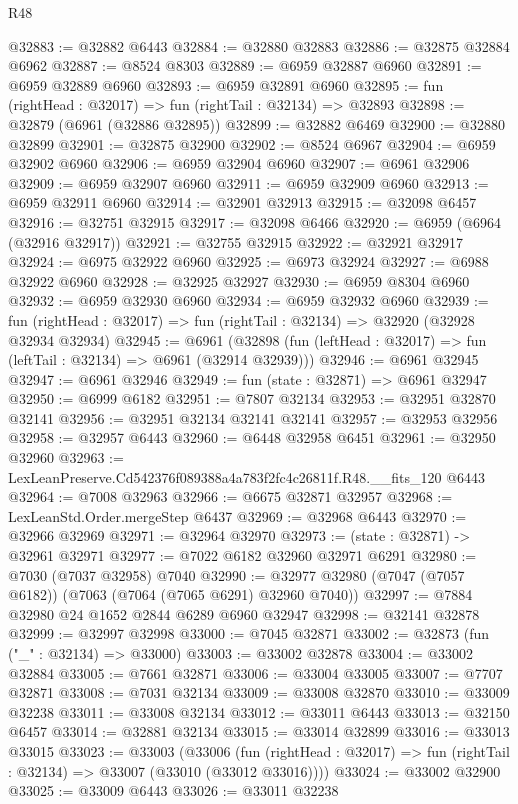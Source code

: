 \begin{lexlean}{R48}
\begin{coremodule}
@32883 := @32882 @6443
@32884 := @32880 @32883
@32886 := @32875 @32884 @6962
@32887 := @8524 @8303
@32889 := @6959 @32887 @6960
@32891 := @6959 @32889 @6960
@32893 := @6959 @32891 @6960
@32895 := fun (rightHead : @32017) => fun (rightTail : @32134) => @32893
@32898 := @32879 (@6961 (@32886 @32895))
@32899 := @32882 @6469
@32900 := @32880 @32899
@32901 := @32875 @32900
@32902 := @8524 @6967
@32904 := @6959 @32902 @6960
@32906 := @6959 @32904 @6960
@32907 := @6961 @32906
@32909 := @6959 @32907 @6960
@32911 := @6959 @32909 @6960
@32913 := @6959 @32911 @6960
@32914 := @32901 @32913
@32915 := @32098 @6457
@32916 := @32751 @32915
@32917 := @32098 @6466
@32920 := @6959 (@6964 (@32916 @32917))
@32921 := @32755 @32915
@32922 := @32921 @32917
@32924 := @6975 @32922 @6960
@32925 := @6973 @32924
@32927 := @6988 @32922 @6960
@32928 := @32925 @32927
@32930 := @6959 @8304 @6960
@32932 := @6959 @32930 @6960
@32934 := @6959 @32932 @6960
@32939 := fun (rightHead : @32017) => fun (rightTail : @32134) => @32920 (@32928 @32934 @32934)
@32945 := @6961
    (@32898 (fun (leftHead : @32017) => fun (leftTail : @32134) => @6961 (@32914 @32939)))
@32946 := @6961 @32945
@32947 := @6961 @32946
@32949 := fun (state : @32871) => @6961 @32947
@32950 := @6999 @6182
@32951 := @7807 @32134
@32953 := @32951 @32870 @32141
@32956 := @32951 @32134 @32141 @32141
@32957 := @32953 @32956
@32958 := @32957 @6443
@32960 := @6448 @32958 @6451
@32961 := @32950 @32960
@32963 := LexLeanPreserve.Cd542376f089388a4a783f2fc4c26811f.R48.__fits_120 @6443
@32964 := @7008 @32963
@32966 := @6675 @32871 @32957
@32968 := LexLeanStd.Order.mergeStep @6437
@32969 := @32968 @6443
@32970 := @32966 @32969
@32971 := @32964 @32970
@32973 := (state : @32871) -> @32961 @32971
@32977 := @7022 @6182 @32960 @32971 @6291
@32980 := @7030 (@7037 @32958) @7040
@32990 := @32977 @32980 (@7047 (@7057 @6182)) (@7063 (@7064 (@7065 @6291) @32960 @7040))
@32997 := @7884 @32980 @24 @1652 @2844 @6289 @6960 @32947
@32998 := @32141 @32878
@32999 := @32997 @32998
@33000 := @7045 @32871
@33002 := @32873 (fun ("_" : @32134) => @33000)
@33003 := @33002 @32878
@33004 := @33002 @32884
@33005 := @7661 @32871
@33006 := @33004 @33005
@33007 := @7707 @32871
@33008 := @7031 @32134
@33009 := @33008 @32870
@33010 := @33009 @32238
@33011 := @33008 @32134
@33012 := @33011 @6443
@33013 := @32150 @6457
@33014 := @32881 @32134
@33015 := @33014 @32899
@33016 := @33013 @33015
@33023 := @33003
    (@33006
      (fun (rightHead : @32017) => fun (rightTail : @32134) => @33007 (@33010 (@33012 @33016))))
@33024 := @33002 @32900
@33025 := @33009 @6443
@33026 := @33011 @32238

\end{coremodule}
\end{lexlean}
